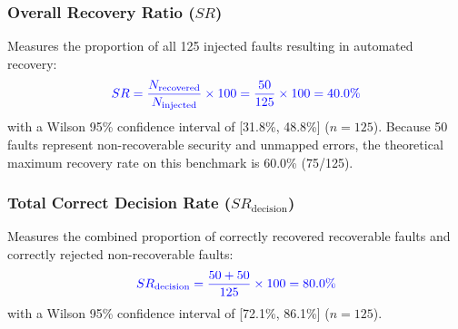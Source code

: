 \documentclass[conference]{IEEEtran}
\newcommand{\chg}[1]{{\color{blue}#1}}
\begin{document}
\subsubsection{\chg{Overall Recovery Ratio ($SR$)}}
\chg{Measures the proportion of all 125 injected faults resulting in automated recovery:}
\begin{equation}
\chg{SR = \frac{N_{\text{recovered}}}{N_{\text{injected}}} \times 100 = \frac{50}{125} \times 100 = 40.0\%}
\end{equation}
\chg{with a Wilson 95\% confidence interval of [31.8\%, 48.8\%] ($n=125$). Because 50 faults represent non-recoverable security and unmapped errors, the theoretical maximum recovery rate on this benchmark is 60.0\% (75/125).}

\subsubsection{\chg{Total Correct Decision Rate ($SR_{\text{decision}}$)}}
\chg{Measures the combined proportion of correctly recovered recoverable faults and correctly rejected non-recoverable faults:}
\begin{equation}
\chg{SR_{\text{decision}} = \frac{50 + 50}{125} \times 100 = 80.0\%}
\end{equation}
\chg{with a Wilson 95\% confidence interval of [72.1\%, 86.1\%] ($n=125$).}
\end{document}

